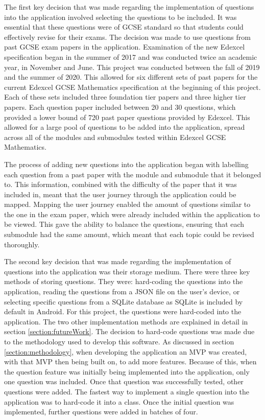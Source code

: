 \documentclass{article}
\begin{document}
The first key decision that was made regarding the implementation of questions into the application involved selecting the questions to be included. It was essential that these questions were of GCSE standard so that students could effectively revise for their exams. The decision was made to use questions from past GCSE exam papers in the application. Examination of the new Edexcel specification began in the summer of 2017 and was conducted twice an academic year, in November and June. This project was conducted between the fall of 2019 and the summer of 2020. This allowed for six different sets of past papers for the current Edexcel GCSE Mathematics specification at the beginning of this project. Each of these sets included three foundation tier papers and three higher tier papers. Each question paper included between 20 and 30 questions, which provided a lower bound of 720 past paper questions provided by Edexcel. This allowed for a large pool of questions to be added into the application, spread across all of the modules and submodules tested within Edexcel GCSE Mathematics. \par

The process of adding new questions into the application began with labelling each question from a past paper with the module and submodule that it belonged to. This information, combined with the difficulty of the paper that it was included in, meant that the user journey through the application could be mapped. Mapping the user journey enabled the amount of questions similar to the one in the exam paper, which were already included within the application to be viewed. This gave the ability to balance the questions, ensuring that each submodule had the same amount, which meant that each topic could be revised thoroughly. \par

The second key decision that was made regarding the implementation of questions into the application was their storage medium. There were three key methods of storing questions. They were: hard-coding the questions into the application, reading the questions from a JSON file on the user's device, or selecting specific questions from a SQLite database as SQLite is included by default in Android. For this project, the questions were hard-coded into the application. The two other implementation methods are explained in detail in section \ref{section:futureWork}. The decision to hard-code questions was made due to the methodology used to develop this software. As discussed in section \ref{section:methodology}, when developing the application an MVP was created, with that MVP then being built on, to add more features. Because of this, when the question feature was initially being implemented into the application, only one question was included. Once that question was successfully tested, other questions were added. The fastest way to implement a single question into the application was to hard-code it into a class. Once the initial question was implemented, further questions were added in batches of four. \par
\end{document}
